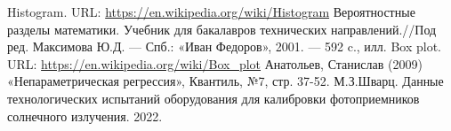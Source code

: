 \documentclass[a4paper,14pt]{article}
\begin{document}
	\newpage
	
	\begin{thebibliography}{4}
		Histogram. URL: \url{https://en.wikipedia.org/wiki/Histogram}
		Вероятностные разделы математики. Учебник для бакалавров технических направлений.//Под ред. Максимова Ю.Д. --- Спб.: «Иван Федоров», 2001. --- 592 c., илл.
		Box plot. URL: \url{https://en.wikipedia.org/wiki/Box_plot}
		Анатольев, Станислав (2009) «Непараметрическая регрессия», Квантиль, №7, стр. 37-52.
		 М.З.Шварц. Данные технологических испытаний оборудования для калибровки фотоприемников солнечного излучения. 2022.
	\end{thebibliography}
\end{document}
